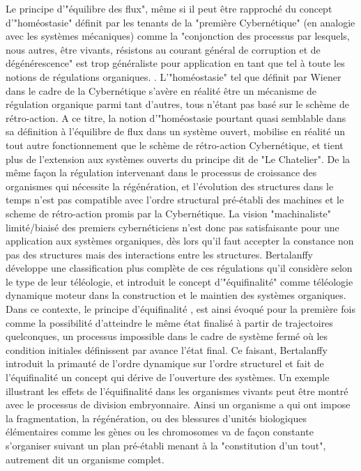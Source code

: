 {%
Le principe d'"équilibre des flux", même si il peut être rapproché du concept d'"homéostasie" définit par les tenants de la "première Cybernétique" (en analogie avec les systèmes mécaniques) comme la "conjonction des processus par lesquels, nous autres, être vivants, résistons au courant général de corruption et de dégénérescence" est trop généraliste pour application en tant que tel à toute les notions de régulations organiques. \autocite[194]{Morin1977} \autocite{Wiener1950}. L'"homéostasie" tel que définit par Wiener dans le cadre de la Cybernétique s'avère en réalité être un mécanisme de régulation organique parmi tant d'autres, tous n'étant pas basé sur le schème de rétro-action. A ce titre, la notion d'"homéostasie pourtant quasi semblable dans sa définition à l'équilibre de flux dans un système ouvert, mobilise en réalité un tout autre fonctionnement que le schème de rétro-action Cybernétique, et tient plus de l'extension aux systèmes ouverts du principe dit de "Le Chatelier". De la même façon la régulation intervenant dans le processus de croissance des organismes qui nécessite la régénération, et l'évolution des structures dans le temps n'est pas compatible avec l'ordre structural pré-établi des machines et le scheme de rétro-action promis par la Cybernétique. La vision "machinaliste" limité/biaisé des premiers cybernéticiens n'est donc pas satisfaisante pour une application aux systèmes organiques, dès lors qu'il faut accepter la constance non pas des structures mais des interactions entre les structures. Bertalanffy développe une classification plus complète de ces régulations qu'il considère selon le type de leur téléologie, et introduit le concept d'"équifinalité" comme téléologie dynamique moteur dans la construction et le maintien des systèmes organiques. Dans ce contexte, le principe d'équifinalité \autocite[131]{Pouvreau2013}, est ainsi évoqué pour la première fois comme la possibilité d'atteindre le même état finalisé à partir de trajectoires quelconques, un processus impossible dans le cadre de système fermé où les condition initiales définissent par avance l'état final. Ce faisant, Bertalanffy introduit la primauté de l'ordre dynamique sur l'ordre structurel et fait de l'équifinalité un concept qui dérive de l'ouverture des systèmes. \autocite[489]{Pouvreau2013} \autocite[647]{Pouvreau2013} Un exemple illustrant les effets de l'équifinalité dans les organismes vivants peut être montré avec le processus de division embryonnaire. Ainsi un organisme a qui ont impose la fragmentation, la régénération, ou des blessures d'unités biologiques élémentaires comme les gènes ou les chromosomes va de façon constante s'organiser suivant un plan pré-établi menant à la "constitution d'un tout", autrement dit un organisme complet. 

}
